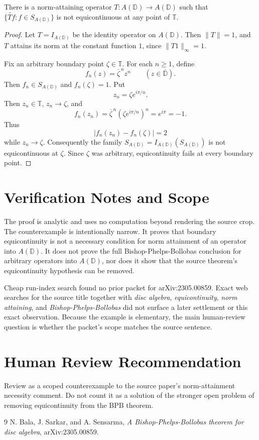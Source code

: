 \documentclass[11pt]{amsart}
\newcommand{\D}{\mathbb{D}}
\newcommand{\T}{\mathbb{T}}
\newcommand{\AD}{A(\mathbb{D})}
\begin{document}
There is a norm-attaining operator $T:\AD\to\AD$ such that
$\{\widetilde{Tf}:f\in S_{\AD}\}$ is not equicontinuous at any point of $\T$.

\begin{proof}
Let $T=I_{\AD}$ be the identity operator on $\AD$. Then $\|T\|=1$, and $T$
attains its norm at the constant function $1$, since $\|T1\|_\infty=1$.

Fix an arbitrary boundary point $\zeta\in\T$. For each $n\geq 1$, define
\[
  f_n(z)=\overline{\zeta}^{\,n}z^n\qquad(z\in\overline{\D}).
\]
Then $f_n\in S_{\AD}$ and $f_n(\zeta)=1$. Put
\[
  z_n=\zeta e^{i\pi/n}.
\]
Then $z_n\in\T$, $z_n\to \zeta$, and
\[
  f_n(z_n)=\overline{\zeta}^{\,n}(\zeta e^{i\pi/n})^n=e^{i\pi}=-1.
\]
Thus
\[
  |f_n(z_n)-f_n(\zeta)|=2
\]
while $z_n\to\zeta$. Consequently the family $S_{\AD}=I_{\AD}(S_{\AD})$ is not
equicontinuous at $\zeta$. Since $\zeta$ was arbitrary, equicontinuity fails at
every boundary point.
\end{proof}

\section*{Verification Notes and Scope}

The proof is analytic and uses no computation beyond rendering the source crop.
The counterexample is intentionally narrow. It proves that boundary
equicontinuity is not a necessary condition for norm attainment of an operator
into $\AD$. It does not prove the full Bishop-Phelps-Bollobas conclusion for
arbitrary operators into $\AD$, nor does it show that the source theorem's
equicontinuity hypothesis can be removed.

Cheap run-index search found no prior packet for arXiv:2305.00859. Exact web
searches for the source title together with \emph{disc algebra},
\emph{equicontinuity}, \emph{norm attaining}, and
\emph{Bishop-Phelps-Bollobas} did not surface a later settlement or this exact
observation. Because the example is elementary, the main human-review question
is whether the packet's scope matches the source sentence.

\section*{Human Review Recommendation}

Review as a scoped counterexample to the source paper's norm-attainment
necessity comment. Do not count it as a solution of the stronger open problem
of removing equicontinuity from the BPB theorem.

\begin{thebibliography}{9}
N. Bala, J. Sarkar, and A. Sensarma,
\emph{A Bishop-Phelps-Bollobas theorem for disc algebra},
arXiv:2305.00859.
\end{thebibliography}
\end{document}
